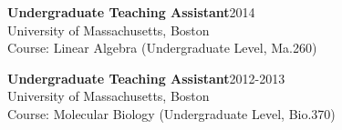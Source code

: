\documentclass[letterpaper]{article}
\renewenvironment{itemize}{
  \begin{list}{}{
    \setlength{\leftmargin}{1.5em}
  }
}{
  \end{list}
}
\begin{document}
\begin{itemize}

\item \textbf{Undergraduate Teaching Assistant}\hfill 2014\\
      University of Massachusetts, Boston\\
      Course: Linear Algebra (Undergraduate Level, Ma.260)

\item \textbf{Undergraduate Teaching Assistant}\hfill 2012-2013\\
      University of Massachusetts, Boston\\
      Course: Molecular Biology (Undergraduate Level, Bio.370)




\end{itemize}
\end{document}
